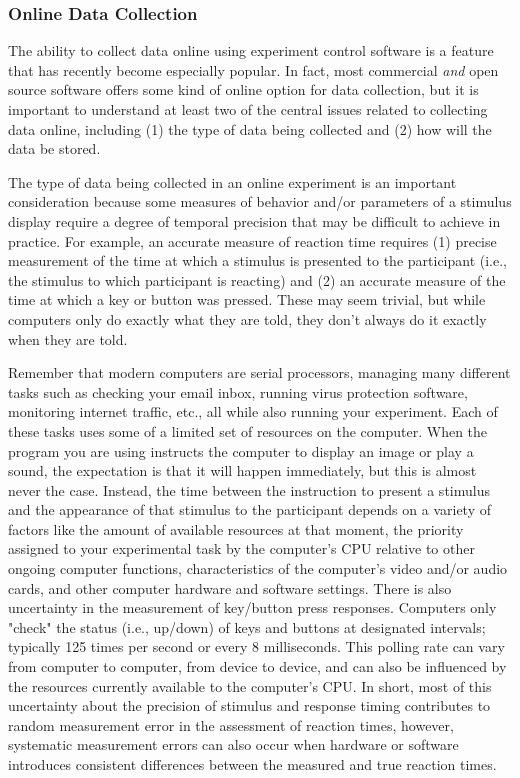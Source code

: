 \subsubsection{Online Data Collection}
The ability to collect data online using experiment control software is a feature that has recently become especially popular.  In fact, most commercial \emph{and} open source software offers some kind of online option for data collection, but it is important to understand at least two of the central issues related to collecting data online, including  (1) the type of data being collected and (2) how will the data be stored.

The type of data being collected in an online experiment is an important consideration because some measures of behavior and/or parameters of a stimulus display require a degree of temporal precision that may be difficult to achieve in practice.  For example, an accurate measure of reaction time requires (1) precise measurement of the time at which a stimulus is presented to the participant (i.e., the stimulus to which participant is reacting) and (2) an accurate measure of the time at which a key or button was pressed.  These may seem trivial, but while computers only do exactly what they are told, they don't always do it exactly when they are told. 

Remember that modern computers are serial processors, managing many different tasks such as checking your email inbox, running virus protection software, monitoring internet traffic, etc., all while also running your experiment. Each of these tasks uses some of a limited set of resources on the computer. When the program you are using instructs the computer to display an image or play a sound, the expectation is that it will happen immediately, but this is almost never the case. Instead, the time between the instruction to present a stimulus and the appearance of that stimulus to the participant depends on a variety of factors like the amount of available resources at that moment, the priority assigned to your experimental task by the computer's CPU relative to other ongoing computer functions, characteristics of the computer's video and/or audio cards, and other computer hardware and software settings.  There is also uncertainty in the measurement of key/button press responses.  Computers only "check" the status (i.e., up/down) of keys and buttons at designated intervals; typically 125 times per second or every 8 milliseconds.  This \gls{polling rate} can vary from computer to computer, from device to device, and can also be influenced by the resources currently available to the computer's CPU.  In short, most of this uncertainty about the precision of stimulus and response timing contributes to random \gls{measurement error} in the assessment of reaction times, however, systematic measurement errors can also occur when hardware or software introduces consistent differences between the measured and true reaction times.

